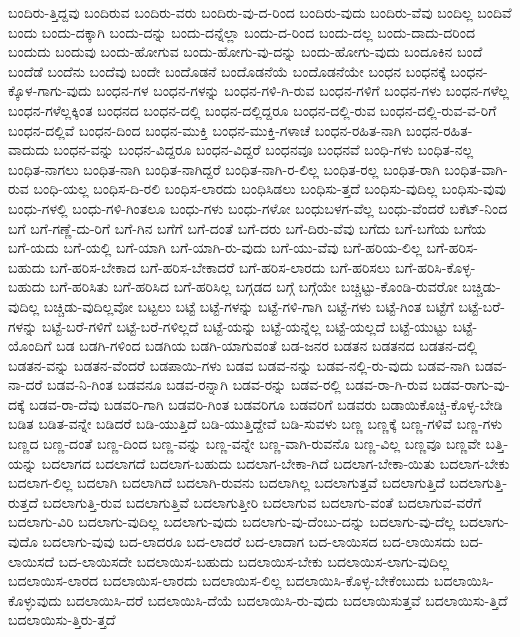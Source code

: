 {ಬಂದಿರು-ತ್ತಿದ್ದವು
ಬಂದಿರುವ
ಬಂದಿರು-ವರು
ಬಂದಿರು-ವು-ದ-ರಿಂದ
ಬಂದಿರು-ವುದು
ಬಂದಿರು-ವೆವು
ಬಂದಿಲ್ಲ
ಬಂದಿವೆ
ಬಂದು
ಬಂದು-ದಕ್ಕಾಗಿ
ಬಂದು-ದನ್ನು
ಬಂದು-ದನ್ನೆಲ್ಲಾ
ಬಂದು-ದ-ರಿಂದ
ಬಂದು-ದಲ್ಲ
ಬಂದು-ದಾದು-ದರಿಂದ
ಬಂದುದು
ಬಂದುವು
ಬಂದು-ಹೋಗುವ
ಬಂದು-ಹೋಗು-ವು-ದನ್ನು
ಬಂದು-ಹೋಗು-ವುದು
ಬಂದೂಕಿನ
ಬಂದೆ
ಬಂದೆಡೆ
ಬಂದೆನು
ಬಂದೆವು
ಬಂದೇ
ಬಂದೊಡನೆ
ಬಂದೊಡನೆಯೆ
ಬಂದೊಡನೆಯೇ
ಬಂಧನ
ಬಂಧನಕ್ಕೆ
ಬಂಧನ-ಕ್ಕೊಳ-ಗಾಗು-ವುದು
ಬಂಧನ-ಗಳ
ಬಂಧನ-ಗಳನ್ನು
ಬಂಧನ-ಗಳಿ-ಗಿ-ರುವ
ಬಂಧನ-ಗಳಿಗೆ
ಬಂಧನ-ಗಳು
ಬಂಧನ-ಗಳೆಲ್ಲ
ಬಂಧನ-ಗಳೆಲ್ಲಕ್ಕಿಂತ
ಬಂಧನದ
ಬಂಧನ-ದಲ್ಲಿ
ಬಂಧನ-ದಲ್ಲಿದ್ದರೂ
ಬಂಧನ-ದಲ್ಲಿ-ರುವ
ಬಂಧನ-ದಲ್ಲಿ-ರುವ-ವ-ರಿಗೆ
ಬಂಧನ-ದಲ್ಲಿವೆ
ಬಂಧನ-ದಿಂದ
ಬಂಧನ-ಮುಕ್ತಿ
ಬಂಧನ-ಮುಕ್ತಿ-ಗಳಾಚೆ
ಬಂಧನ-ರಹಿತ-ನಾಗಿ
ಬಂಧನ-ರಹಿತ-ವಾದುದು
ಬಂಧನ-ವನ್ನು
ಬಂಧನ-ವಿದ್ದರೂ
ಬಂಧನ-ವಿದ್ದರೆ
ಬಂಧನವೂ
ಬಂಧನವೆ
ಬಂಧಿ-ಗಳು
ಬಂಧಿತ-ನಲ್ಲ
ಬಂಧಿತ-ನಾಗಲು
ಬಂಧಿತ-ನಾಗಿ
ಬಂಧಿತ-ನಾಗಿದ್ದರೆ
ಬಂಧಿತ-ನಾಗಿ-ರ-ಲಿಲ್ಲ
ಬಂಧಿತ-ರಲ್ಲ
ಬಂಧಿತ-ರಾಗಿ
ಬಂಧಿತ-ವಾಗಿ-ರುವ
ಬಂಧಿ-ಯಲ್ಲ
ಬಂಧಿಸ-ದಿ-ರಲಿ
ಬಂಧಿಸ-ಲಾರದು
ಬಂಧಿಸಿಡಲು
ಬಂಧಿಸು-ತ್ತದೆ
ಬಂಧಿಸು-ವುದಿಲ್ಲ
ಬಂಧಿಸು-ವುವು
ಬಂಧು-ಗಳಲ್ಲಿ
ಬಂಧು-ಗಳಿ-ಗಿಂತಲೂ
ಬಂಧು-ಗಳು
ಬಂಧು-ಗಳೋ
ಬಂಧುಬಳಗ-ವೆಲ್ಲ
ಬಂಧು-ವೆಂದರೆ
ಬಕೆಟ್-ನಿಂದ
ಬಗೆ
ಬಗೆ-ಗಣ್ಣೆ-ದು-ರಿಗೆ
ಬಗೆ-ಗಿನ
ಬಗೆಗೆ
ಬಗೆ-ದಂತೆ
ಬಗೆ-ದರು
ಬಗೆ-ದಿರು-ವೆವು
ಬಗೆದು
ಬಗೆ-ಬಗೆಯ
ಬಗೆಯ
ಬಗೆ-ಯದು
ಬಗೆ-ಯಲ್ಲಿ
ಬಗೆ-ಯಾಗಿ
ಬಗೆ-ಯಾಗಿ-ರು-ವುದು
ಬಗೆ-ಯು-ವೆವು
ಬಗೆ-ಹರಿಯ-ಲಿಲ್ಲ
ಬಗೆ-ಹರಿಸ-ಬಹುದು
ಬಗೆ-ಹರಿಸ-ಬೇಕಾದ
ಬಗೆ-ಹರಿಸ-ಬೇಕಾದರೆ
ಬಗೆ-ಹರಿಸ-ಲಾರದು
ಬಗೆ-ಹರಿಸಲು
ಬಗೆ-ಹರಿಸಿ-ಕೊಳ್ಳ-ಬಹುದು
ಬಗೆ-ಹರಿಸಿತು
ಬಗೆ-ಹರಿಸಿದ
ಬಗೆ-ಹರಿಸಿಲ್ಲ
ಬಗ್ಗಡದ
ಬಗ್ಗೆ
ಬಗ್ಗೆಯೇ
ಬಚ್ಚಿಟ್ಟು-ಕೊಂಡಿ-ರುವರೋ
ಬಚ್ಚಿಡು-ವುದಿಲ್ಲ
ಬಚ್ಚಿಡು-ವುದಿಲ್ಲವೋ
ಬಟ್ಟಲು
ಬಟ್ಟೆ
ಬಟ್ಟೆ-ಗಳನ್ನು
ಬಟ್ಟೆ-ಗಳಿ-ಗಾಗಿ
ಬಟ್ಟೆ-ಗಳು
ಬಟ್ಟೆ-ಗಿಂತ
ಬಟ್ಟೆಗೆ
ಬಟ್ಟೆ-ಬರೆ-ಗಳನ್ನು
ಬಟ್ಟೆ-ಬರೆ-ಗಳಿಗೆ
ಬಟ್ಟೆ-ಬರೆ-ಗಳಿಲ್ಲದೆ
ಬಟ್ಟೆ-ಯನ್ನು
ಬಟ್ಟೆ-ಯನ್ನೆಲ್ಲ
ಬಟ್ಟೆ-ಯಲ್ಲದೆ
ಬಟ್ಟೆ-ಯುಟ್ಟು
ಬಟ್ಟೆ-ಯೊಂದಿಗೆ
ಬಡ
ಬಡಗಿ-ಗಳಿಂದ
ಬಡಗಿಯ
ಬಡಗಿ-ಯಾಗುವಂತೆ
ಬಡ-ಜನರ
ಬಡತನ
ಬಡತನದ
ಬಡತನ-ದಲ್ಲಿ
ಬಡತನ-ವನ್ನು
ಬಡತನ-ವೆಂದರೆ
ಬಡಪಾಯಿ-ಗಳು
ಬಡವ
ಬಡವ-ನನ್ನು
ಬಡವ-ನಲ್ಲಿ-ರು-ವುದು
ಬಡವ-ನಾಗಿ
ಬಡವ-ನಾ-ದರೆ
ಬಡವ-ನಿ-ಗಿಂತ
ಬಡವನೂ
ಬಡವ-ರನ್ನಾಗಿ
ಬಡವ-ರನ್ನು
ಬಡವ-ರಲ್ಲಿ
ಬಡವ-ರಾ-ಗಿ-ರುವ
ಬಡವ-ರಾಗು-ವು-ದಕ್ಕೆ
ಬಡವ-ರಾ-ದೆವು
ಬಡವರಿ-ಗಾಗಿ
ಬಡವರಿ-ಗಿಂತ
ಬಡವರಿಗೂ
ಬಡವರಿಗೆ
ಬಡವರು
ಬಡಾಯಿಕೊಚ್ಚಿ-ಕೊಳ್ಳ-ಬೇಡಿ
ಬಡಿತ
ಬಡಿತ-ವನ್ನೇ
ಬಡಿದರೆ
ಬಡಿ-ಯುತ್ತಿದೆ
ಬಡಿ-ಯುತ್ತಿದ್ದೇವೆ
ಬಡಿ-ಸುವಳು
ಬಣ್ಣ
ಬಣ್ಣಕ್ಕೆ
ಬಣ್ಣ-ಗಳಿವೆ
ಬಣ್ಣ-ಗಳು
ಬಣ್ಣದ
ಬಣ್ಣ-ದಂತೆ
ಬಣ್ಣ-ದಿಂದ
ಬಣ್ಣ-ವನ್ನು
ಬಣ್ಣ-ವನ್ನೇ
ಬಣ್ಣ-ವಾಗಿ-ರುವನೊ
ಬಣ್ಣ-ವಿಲ್ಲ
ಬಣ್ಣವೂ
ಬಣ್ಣವೇ
ಬತ್ತಿ-ಯನ್ನು
ಬದಲಾಗದ
ಬದಲಾಗದೆ
ಬದಲಾಗ-ಬಹುದು
ಬದಲಾಗ-ಬೇಕಾ-ಗಿದೆ
ಬದಲಾಗ-ಬೇಕಾ-ಯಿತು
ಬದಲಾಗ-ಬೇಕು
ಬದಲಾಗ-ಲಿಲ್ಲ
ಬದಲಾಗಿ
ಬದಲಾಗಿದೆ
ಬದಲಾಗಿ-ರುವನು
ಬದಲಾಗಿಲ್ಲ
ಬದಲಾಗುತ್ತವೆ
ಬದಲಾಗುತ್ತಿದೆ
ಬದಲಾಗುತ್ತಿ-ರುತ್ತದೆ
ಬದಲಾಗುತ್ತಿ-ರುವ
ಬದಲಾಗುತ್ತಿವೆ
ಬದಲಾಗುತ್ತೀರಿ
ಬದಲಾಗುವ
ಬದಲಾಗು-ವಂತೆ
ಬದಲಾಗುವ-ವರೆಗೆ
ಬದಲಾಗು-ವಿರಿ
ಬದಲಾಗು-ವುದಿಲ್ಲ
ಬದಲಾಗು-ವುದು
ಬದಲಾಗು-ವು-ದೆಂಬು-ದನ್ನು
ಬದಲಾಗು-ವು-ದೆಲ್ಲ
ಬದಲಾಗು-ವುದೊ
ಬದಲಾಗು-ವುವು
ಬದ-ಲಾದರೂ
ಬದ-ಲಾದರೆ
ಬದ-ಲಾದಾಗ
ಬದ-ಲಾಯಿಸದ
ಬದ-ಲಾಯಿಸದು
ಬದ-ಲಾಯಿಸದೆ
ಬದ-ಲಾಯಿಸದೇ
ಬದಲಾಯಿಸ-ಬಹುದು
ಬದಲಾಯಿಸ-ಬೇಕು
ಬದಲಾಯಿಸ-ಲಾಗು-ವುದಿಲ್ಲ
ಬದಲಾಯಿಸ-ಲಾರದ
ಬದಲಾಯಿಸ-ಲಾರದು
ಬದಲಾಯಿಸ-ಲಿಲ್ಲ
ಬದಲಾಯಿಸಿ-ಕೊಳ್ಳ-ಬೇಕೆಂಬುದು
ಬದಲಾಯಿಸಿ-ಕೊಳ್ಳುವುದು
ಬದಲಾಯಿಸಿ-ದರೆ
ಬದಲಾಯಿಸಿ-ದೆಯೆ
ಬದಲಾಯಿಸಿ-ರು-ವುದು
ಬದಲಾಯಿಸುತ್ತವೆ
ಬದಲಾಯಿಸು-ತ್ತಿದೆ
ಬದಲಾಯಿಸು-ತ್ತಿರು-ತ್ತದೆ
}

